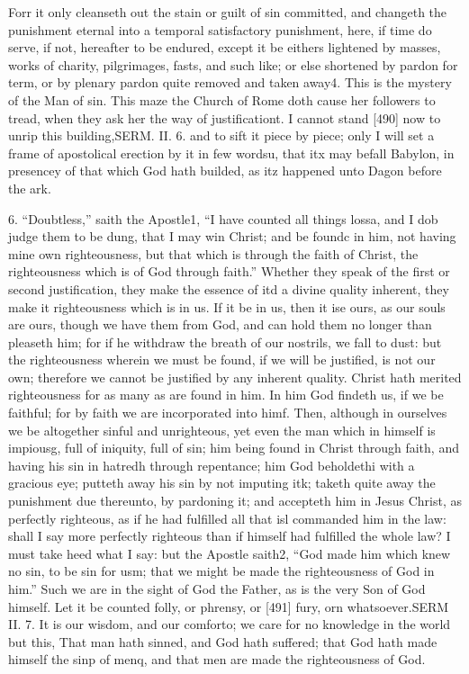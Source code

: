 Forr it only cleanseth out the stain or guilt of sin committed, and changeth the punishment eternal into a temporal satisfactory punishment, here, if time do serve, if not, hereafter to be endured, except it be eithers lightened by masses, works of charity, pilgrimages, fasts, and such like; or else shortened by pardon for term, or by plenary pardon quite removed and taken away4. This is the mystery of the Man of sin. This maze the Church of Rome doth cause her followers to tread, when they ask her the way of justificationt. I cannot stand [490] now to unrip this building,SERM. II. 6. and to sift it piece by piece; only I will set a frame of apostolical erection by it in few wordsu, that itx may befall Babylon, in presencey of that which God hath builded, as itz happened unto Dagon before the ark.

6. “Doubtless,” saith the Apostle1, “I have counted all things lossa, and I dob judge them to be dung, that I may win Christ; and be foundc in him, not having mine own righteousness, but that which is through the faith of Christ, the righteousness which is of God through faith.” Whether they speak of the first or second justification, they make the essence of itd a divine quality inherent, they make it righteousness which is in us. If it be in us, then it ise ours, as our souls are ours, though we have them from God, and can hold them no longer than pleaseth him; for if he withdraw the breath of our nostrils, we fall to dust: but the righteousness wherein we must be found, if we will be justified, is not our own; therefore we cannot be justified by any inherent quality. Christ hath merited righteousness for as many as are found in him. In him God findeth us, if we be faithful; for by faith we are incorporated into himf. Then, although in ourselves we be altogether sinful and unrighteous, yet even the man which in himself is impiousg, full of iniquity, full of sin; him being found in Christ through faith, and having his sin in hatredh through repentance; him God beholdethi with a gracious eye; putteth away his sin by not imputing itk; taketh quite away the punishment due thereunto, by pardoning it; and accepteth him in Jesus Christ, as perfectly righteous, as if he had fulfilled all that isl commanded him in the law: shall I say more perfectly righteous than if himself had fulfilled the whole law? I must take heed what I say: but the Apostle saith2, “God made him which knew no sin, to be sin for usm; that we might be made the righteousness of God in him.” Such we are in the sight of God the Father, as is the very Son of God himself. Let it be counted folly, or phrensy, or [491] fury, orn whatsoever.SERM II. 7. It is our wisdom, and our comforto; we care for no knowledge in the world but this, That man hath sinned, and God hath suffered; that God hath made himself the sinp of menq, and that men are made the righteousness of God.

